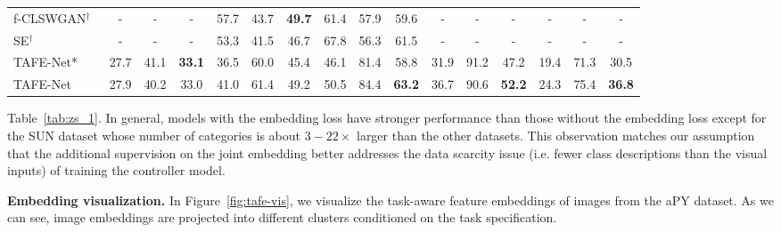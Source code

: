 \documentclass[10pt,twocolumn,letterpaper]{article}
\newcommand{\model}{TAFE-Net\xspace}
\newcommand\minisection[1]{\vspace{2mm}\noindent \textbf{#1}}
\begin{document}
\begin{table*}[t]
{\begin{tabular}{@{}lccc|ccc|ccc|ccc|ccc@{}}
\midrule
f-CLSWGAN$^\dagger$~\cite{xian2018feature} &-&-&-& 57.7 & 43.7 & \textbf{49.7}&
61.4 & 57.9 & 59.6 &-&-&-& -&-&- \\
SE$^\dagger$~\cite{verma2017generalized} &-&-&-& 53.3 & 41.5 & 46.7 
& 67.8 & 56.3 & 61.5  &-&-&-& -&-&- \\
\midrule
\model* & 27.7 & 41.1 & \textbf{33.1} & 36.5 & 60.0 & 45.4 & 46.1 & 81.4 & 58.8 & 31.9 & 91.2 & 47.2 & 19.4 & 71.3 & 30.5 \\
\model & 27.9 & 40.2 & 33.0 & 41.0 & 61.4 & 49.2 & 50.5 & 84.4 & \textbf{63.2} & 36.7 & 90.6 &\textbf{52.2} & 24.3 & 75.4 & \textbf{36.8}\\
\bottomrule
\end{tabular}}
\end{table*}%
Table~\ref{tab:zs_1}. 
In general, models with the embedding loss have stronger performance than those 
without the embedding loss except for the SUN dataset whose number of
categories is about $3-22\times$ larger than the other datasets.  This observation matches our assumption
that the additional supervision on the joint embedding better addresses the data scarcity issue (i.e. fewer
class descriptions than the visual inputs) of training the controller model. 

\minisection{Embedding visualization.}
In Figure~\ref{fig:tafe-vis}, we visualize the task-aware feature embeddings 
of images from the aPY dataset. As we can see, image embeddings are projected 
into different clusters conditioned on the task specification. 
\end{document}
